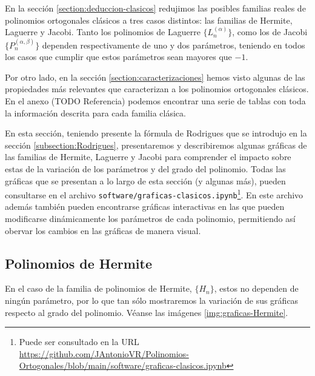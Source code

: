 En la sección \ref{section:deduccion-clasicos} redujimos las posibles familias reales de polinomios ortogonales clásicos a tres casos distintos: las familias de Hermite, Laguerre y Jacobi. Tanto los polinomios de Laguerre $\{L_n^{(\alpha)}\}$, como los de Jacobi $\{P_n^{(\alpha,\beta)}\}$ dependen respectivamente de uno y dos parámetros, teniendo en todos los casos que cumplir que estos parámetros sean mayores que $-1$. 

Por otro lado, en la sección \ref{section:caracterizaciones} hemos visto algunas de las propiedades más relevantes que caracterizan a los polinomios ortogonales clásicos. En el anexo (TODO Referencia) podemos encontrar una serie de tablas con toda la información descrita para cada familia clásica.

En esta sección, teniendo presente la fórmula de Rodrigues que se introdujo en la sección \ref{subsection:Rodrigues}, presentaremos y describiremos algunas gráficas de las familias de Hermite, Laguerre y Jacobi para comprender el impacto sobre estas de la variación de los parámetros y del grado del polinomio. Todas las gráficas que se presentan a lo largo de esta sección (y algunas más), pueden consultarse en el archivo \texttt{software/graficas-clasicos.ipynb}\footnote{Puede ser consultado en la URL \url{https://github.com/JAntonioVR/Polinomios-Ortogonales/blob/main/software/graficas-clasicos.ipynb}}. En este archivo además también pueden encontrarse gráficas interactivas en las que pueden modificarse dinámicamente los parámetros de cada polinomio, permitiendo así obervar los cambios en las gráficas de manera visual.

\subsection{Polinomios de Hermite}

En el caso de la familia de polinomios de Hermite, $\{H_n\}$, estos no dependen de ningún parámetro, por lo que tan sólo mostraremos la variación de sus gráficas respecto al grado del polinomio. Véanse las imágenes \ref{img:graficas-Hermite}.

